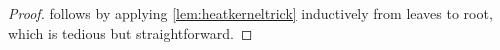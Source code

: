 \documentclass[reqno,draft]{amsart}
\numberwithin{equation}{section}
\theoremstyle{plain}
\theoremstyle{remark}
\newcommand*\diff{\mathop{}\!\mathrm{d}}
\DeclareMathOperator{\ch}{ch}
\newcommand{\fpart}{\Pi} %
\DeclareMathOperator{\rt}{rt}
\DeclareMathOperator{\nd}{nd}
\newcommand{\rfy}[1]{\widetilde{{#1}}} %
\newcommand{\fsp}{f_\mathrm{sp}}
\newcommand{\interp}{\overline{x}} %
\begin{document}
\begin{proof}
     follows by applying \cref{lem:heatkerneltrick} inductively from leaves to root, which is tedious but straightforward.


\end{proof}
\end{document}
